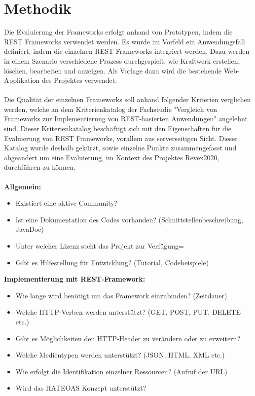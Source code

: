 \documentclass[a4paper,11pt,german,public]{INSOexpose}
\begin{document}
\section{Methodik}

Die Evaluierung der Frameworks erfolgt anhand von Prototypen, indem die REST Frameworks verwendet werden. Es wurde im Vorfeld ein Anwendungsfall definiert, indem die einzelnen REST Frameworks  integriert werden. Dazu werden in einem Szenario verschiedene Prozess durchgespielt, wie Kraftwerk erstellen, löschen, bearbeiten und anzeigen. Als Vorlage dazu wird die bestehende Web-Applikation des Projektes verwendet.
\\\\
Die Qualität der einzelnen Frameworks soll anhand folgender Kriterien verglichen werden, welche an dem Kriterienkatalog der Fachstudie "Vergleich von Frameworks zur Implementierung von REST-basierten Anwendungen" \cite{vergleich13} angelehnt sind. Dieser Kriterienkatalog beschäftigt sich mit den Eigenschaften für die Evaluierung von REST Frameworks, vorallem aus serverseitigen Sicht. Dieser Katalog wurde deshalb gekürzt, sowie einzelne Punkte zusammengefasst und abgeändert um eine Evaluierung, im Kontext des Projektes Revex2020, durchführen zu können.
\\\\
\textbf{Allgemein:}
\begin{itemize}[label=$-$]
	\item Existiert eine aktive Community?
	\item Ist eine Dokumentation des Codes vorhanden? (Schnittstellenbeschreibung, JavaDoc)
	\item Unter welcher Lizenz steht das Projekt zur Verfügung=
	\item Gibt es Hilfestellung für Entwicklung? (Tutorial, Codebeispiele)
\end{itemize}

\textbf{Implementierung mit REST-Framework:}
\begin{itemize}[label=$-$]
	\item Wie lange wird benötigt um das Framework einzubinden?  (Zeitdauer)
	\item Welche HTTP-Verben werden unterstützt? (GET, POST, PUT, DELETE etc.)
	\item Gibt es Möglichkeiten den HTTP-Header zu verändern oder zu erweitern?
	\item Welche Medientypen werden unterstützt? (JSON, HTML, XML etc.)
	\item Wie erfolgt die Identifikation einzelner Ressourcen? (Aufruf der URL)
	\item Wird das HATEOAS Konzept unterstützt?
\end{itemize}
\end{document}
